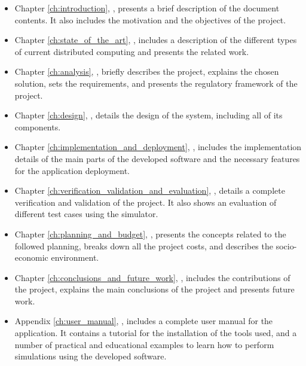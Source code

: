\begin{itemize}

\item Chapter \ref{ch:introduction}, \textit{}, presents a brief description of the document contents. It also includes the motivation and the objectives of the project.

\item Chapter \ref{ch:state_of_the_art}, \textit{}, includes a description of the different types of current distributed computing and presents the related work.

\item Chapter \ref{ch:analysis}, \textit{}, briefly describes the project, explains the chosen solution, sets the requirements, and presents the regulatory \gls{framework} of the project.

\item Chapter \ref{ch:design}, \textit{}, details the design of the system, including all of its components.

\item Chapter \ref{ch:implementation_and_deployment}, \textit{}, includes the implementation details of the main parts of the developed software and the necessary features for the application deployment.

\item Chapter \ref{ch:verification_validation_and_evaluation}, \textit{}, details a complete verification and validation of the project. It also shows an evaluation of different test cases using  the simulator.

\item Chapter \ref{ch:planning_and_budget}, \textit{}, presents the concepts related to the followed planning, breaks down all the project costs, and describes the socio-economic environment.

\item Chapter \ref{ch:conclusions_and_future_work}, \textit{}, includes the contributions of the project, explains the main conclusions of the project and presents future work.

\item Appendix \ref{ch:user_manual}, \textit{}, includes a complete user manual for the application. It contains a tutorial for the installation of the tools used, and a number of practical and educational examples to learn how to perform simulations using the developed software. 

\end{itemize}

